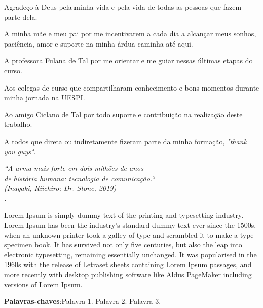 \documentclass[
	12pt,				%
	openright,			%
	oneside,			%
	a4paper,			%
	chapter=TITLE,		%
	english,			%
	brazil,				%
	]{abntex2}
\begin{document}
\begin{agradecimentos}
\ABNTEXchapterfont
Agradeço à Deus pela minha vida e pela vida de todas as pessoas que fazem parte dela.

A minha mãe e meu pai por me incentivarem a cada dia a alcançar meus sonhos, paciência, amor e suporte na minha árdua caminha até aqui.

A professora Fulana de Tal por me orientar e me guiar nessas últimas etapas do curso.

Aos colegas de curso que compartilharam conhecimento e bons momentos durante minha jornada na UESPI.

Ao amigo Ciclano de Tal por todo suporte e contribuição na realização deste trabalho.

A todos que direta ou indiretamente fizeram parte da minha formação, \textit{"thank you guys"}.

\end{agradecimentos}

\begin{epigrafe}
    \vspace*{\fill}
	\begin{flushright}
		\textit{``A arma mais forte em dois milhões de anos\\
		de história humana: tecnologia de comunicação.`` \\
		(Inagaki, Riichiro; Dr. Stone, 2019)\\.}
	\end{flushright}
\end{epigrafe}


\setlength{\absparsep}{18pt} %
\begin{resumo}
\ABNTEXchapterfont
Lorem Ipsum is simply dummy text of the printing and typesetting industry. Lorem Ipsum has been the industry's standard dummy text ever since the 1500s, when an unknown printer took a galley of type and scrambled it to make a type specimen book. It has survived not only five centuries, but also the leap into electronic typesetting, remaining essentially unchanged. It was popularised in the 1960s with the release of Letraset sheets containing Lorem Ipsum passages, and more recently with desktop publishing software like Aldus PageMaker including versions of Lorem Ipsum.

\textbf{Palavras-chaves}:Palavra-1. Palavra-2. Palavra-3.
\end{resumo}
\end{document}
